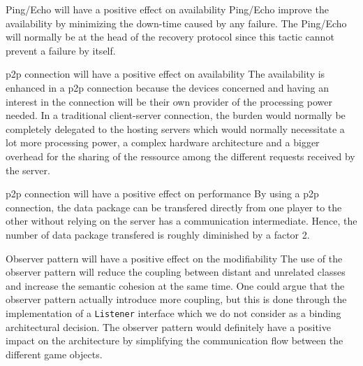 
\begin{description}[style=nextline]
  \item[S1\label{s1}] Ping/Echo will have a positive effect on availability
  \vspace{\baselineskip}
  \newline
  Ping/Echo improve the availability by minimizing the down-time caused by any failure. The Ping/Echo will normally be at the head of the recovery protocol since this tactic cannot prevent a failure by itself.

  \item[S2\label{s2}] \gls{p2p} connection will have a positive effect on availability
  \vspace{\baselineskip}
  \newline
  The availability is enhanced in a \gls{p2p} connection because the devices concerned and having an interest in the connection will be their own provider of the processing power needed. In a traditional client-server connection, the burden would normally be completely delegated to the hosting servers which would normally necessitate a lot more processing power, a complex hardware architecture and a bigger overhead for the sharing of the ressource among the different requests received by the server.

  \item[S3\label{s3}] \gls{p2p} connection will have a positive effect on performance
  \vspace{\baselineskip}
  \newline
  By using a \gls{p2p} connection, the data package can be transfered directly from one player to the other without relying on the server has a communication intermediate. Hence, the number of data package transfered is roughly diminished by a factor 2.

  \item[S4\label{s4}] Observer pattern will have a positive effect on the modifiability
  \vspace{\baselineskip}
  \newline
  The use of the observer pattern will reduce the coupling between distant and unrelated classes and increase the semantic cohesion at the same time. One could argue that the observer pattern actually introduce more coupling, but this is done through the implementation of a \texttt{Listener} interface which we do not consider as a binding architectural decision. The observer pattern would definitely have a positive impact on the architecture by simplifying the communication flow between the different game objects.
\end{description}

